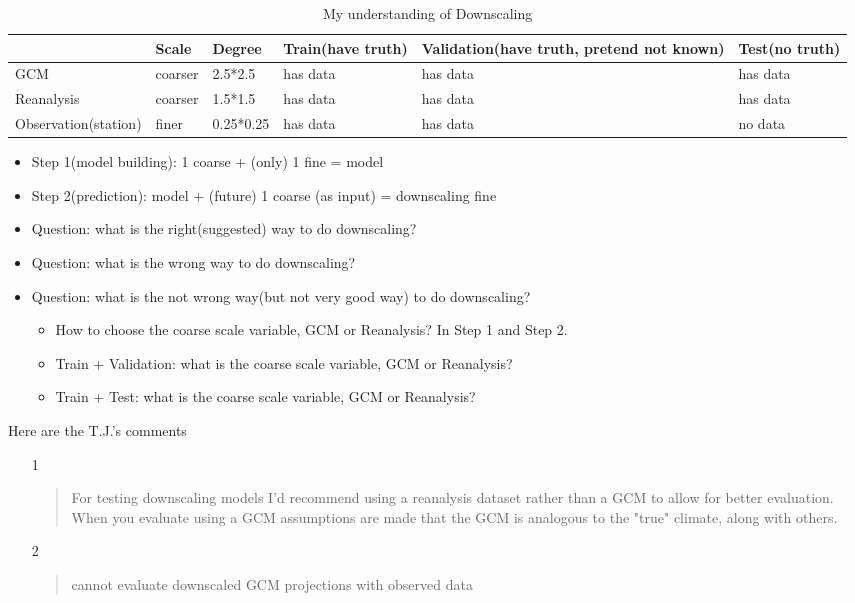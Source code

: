 \documentclass[10pt]{article}
\begin{document}
% 
\begin{table}[]
\centering
\caption{My understanding of Downscaling}
\label{my-label}
\begin{tabular}{|l|l|l|l|l|l|}
\hline
                     & Scale  & Degree    & Train(have truth) & Validation(have truth, pretend not known) & Test(no truth) \\ \hline
\rowcolor[HTML]{EFEFEF} 
GCM                  & coarser & 2.5*2.5   & has data          & has data                                  & has data       \\ \hline
\rowcolor[HTML]{EFEFEF} 
Reanalysis           & coarser & 1.5*1.5   & has data          & has data                                  & has data       \\ \hline
\rowcolor[HTML]{656565} 
Observation(station) & finer  & 0.25*0.25 & has data          & has data                                  & no data        \\ \hline
\end{tabular}
\end{table}

\begin{itemize}
\item Step 1(model building): 1 coarse + (only) 1 fine = model
\item Step 2(prediction): model + (future) 1 coarse (as input) = downscaling fine 
\item Question: what is the right(suggested) way to do downscaling? 
\item Question: what is the wrong way to do downscaling?
\item Question: what is the not wrong way(but not very good way) to do downscaling?
\begin{itemize}
\item How to choose the coarse scale variable, GCM or Reanalysis? In Step 1 and Step 2.
\item Train + Validation: what is the coarse scale variable, GCM or Reanalysis?
\item Train + Test: what is the coarse scale variable, GCM or Reanalysis?
\end{itemize}
\end{itemize}

Here are the T.J.'s comments

\begin{itemize}
\item[1] \begin{quotation}
For testing downscaling models I'd recommend using a reanalysis dataset rather than a GCM to allow for better evaluation.  When you evaluate using a GCM assumptions are made that the GCM is analogous to the "true" climate, along with others.
\end{quotation}
\item[2] \begin{quotation}
cannot evaluate downscaled GCM projections with observed data
\end{quotation}
\end{itemize}
\end{document}
